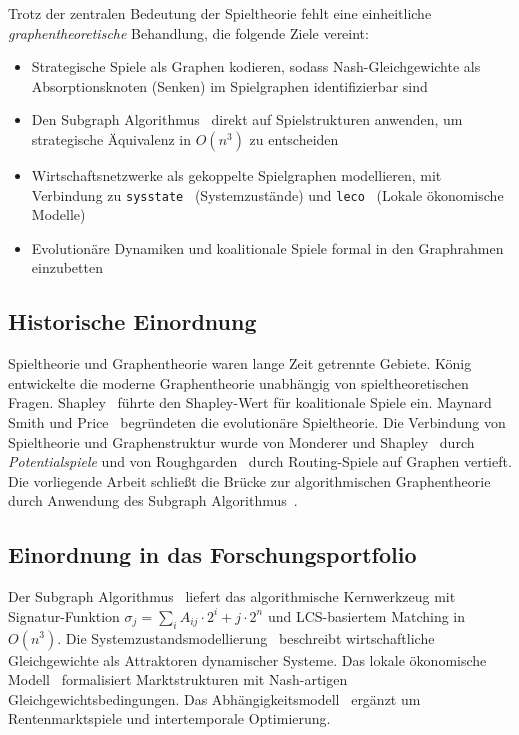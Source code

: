 ﻿\documentclass[a4paper,12pt]{article}
\theoremstyle{definition}
\begin{document}
Trotz der zentralen Bedeutung der Spieltheorie fehlt eine einheitliche
\emph{graphentheoretische} Behandlung, die folgende Ziele vereint:
\begin{itemize}
    \item Strategische Spiele als Graphen kodieren, sodass Nash-Gleichgewichte
          als Absorptionsknoten (Senken) im Spielgraphen identifizierbar sind
    \item Den Subgraph Algorithmus~\cite{epp2026subgraph} direkt auf
          Spielstrukturen anwenden, um strategische \"Aquivalenz in $O(n^3)$
          zu entscheiden
    \item Wirtschaftsnetzwerke als gekoppelte Spielgraphen modellieren,
          mit Verbindung zu \texttt{sysstate}~\cite{epp2026sysstate}
          (Systemzust\"ande) und \texttt{leco}~\cite{epp2026leco} (Lokale
          \"okonomische Modelle)
    \item Evolutionäre Dynamiken und koalitionale Spiele formal in den
          Graphrahmen einzubetten
\end{itemize}

\subsection{Historische Einordnung}

Spieltheorie und Graphentheorie waren lange Zeit getrennte Gebiete.
K\"onig~\cite{konig1936} entwickelte die moderne Graphentheorie unabh\"angig
von spieltheoretischen Fragen. Shapley~\cite{shapley1953} f\"uhrte den
Shapley-Wert f\"ur koalitionale Spiele ein. Maynard Smith und
Price~\cite{maynardsmith1973} begr\"undeten die evolutionäre Spieltheorie.
Die Verbindung von Spieltheorie und Graphenstruktur wurde von
Monderer und Shapley~\cite{monderer1996} durch \emph{Potentialspiele} und
von Roughgarden~\cite{roughgarden2005} durch Routing-Spiele auf Graphen vertieft.
Die vorliegende Arbeit schlie{\ss}t die Br\"ucke zur algorithmischen
Graphentheorie durch Anwendung des Subgraph Algorithmus~\cite{epp2026subgraph}.

\subsection{Einordnung in das Forschungsportfolio}

Der Subgraph Algorithmus~\cite{epp2026subgraph} liefert das algorithmische
Kernwerkzeug mit Signatur-Funktion
$\sigma_j = \sum_i A_{ij} \cdot 2^i + j \cdot 2^n$ und LCS-basiertem
Matching in $O(n^3)$.
Die Systemzustandsmodellierung~\cite{epp2026sysstate} beschreibt
wirtschaftliche Gleichgewichte als Attraktoren dynamischer Systeme.
Das lokale \"okonomische Modell~\cite{epp2026leco} formalisiert Marktstrukturen
mit Nash-artigen Gleichgewichtsbedingungen.
Das Abh\"angigkeitsmodell~\cite{epp2026depension} erg\"anzt um Rentenmarktspiele
und intertemporale Optimierung.
\end{document}
